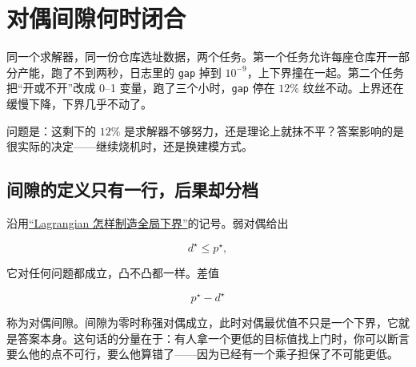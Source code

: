 \section{对偶间隙何时闭合}
\label{sec:09-Convex-Optimization/05-Duality/02}

同一个求解器，同一份仓库选址数据，两个任务。第一个任务允许每座仓库开一部分产能，跑了不到两秒，日志里的 \texttt{gap} 掉到 \(10^{-9}\)，上下界撞在一起。第二个任务把``开或不开''改成 0--1 变量，跑了三个小时，\texttt{gap} 停在 \(12\%\) 纹丝不动。上界还在缓慢下降，下界几乎不动了。

问题是：这剩下的 \(12\%\) 是求解器不够努力，还是理论上就抹不平？答案影响的是很实际的决定——继续烧机时，还是换建模方式。

\subsection{间隙的定义只有一行，后果却分档}

沿用\hyperref[sec:09-Convex-Optimization/05-Duality/01]{``Lagrangian 怎样制造全局下界''}的记号。弱对偶给出

\[
d^\star\le p^\star,
\]

它对任何问题都成立，凸不凸都一样。差值

\[
p^\star-d^\star
\]

称为对偶间隙。间隙为零时称强对偶成立，此时对偶最优值不只是一个下界，它就是答案本身。这句话的分量在于：有人拿一个更低的目标值找上门时，你可以断言要么他的点不可行，要么他算错了——因为已经有一个乘子担保了不可能更低。

